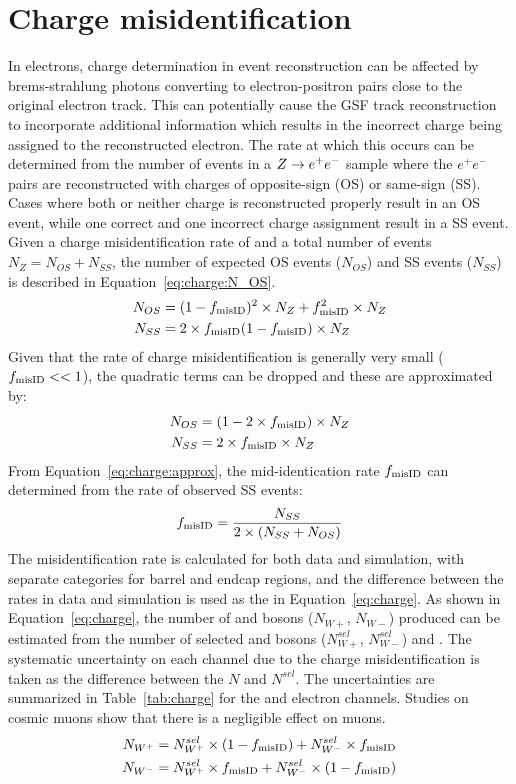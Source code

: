\section{Charge misidentification}
In electrons, charge determination in event reconstruction can be affected by brems-strahlung photons converting to electron-positron pairs close to the original electron track. This can potentially cause the GSF track reconstruction to incorporate additional information which results in the incorrect charge being assigned to the reconstructed electron. The rate at which this occurs can be determined from the number of events in a $Z \to e^+ e^-$ sample where the $e^+ e^-$ pairs are reconstructed with charges of opposite-sign (OS) or same-sign (SS). Cases where both or neither charge is reconstructed properly result in an OS event, while one correct and one incorrect charge assignment result in a SS event. Given a charge misidentification rate of \fq and a total number of \zee events $N_Z = N_{OS}+N_{SS}$, the number of expected OS events ($N_{OS}$) and SS events ($N_{SS}$) is described in Equation~\ref{eq:charge:N_OS}. 
\begin{equation}
\begin{aligned}
N_{OS} &= (1 - f_{\mathrm{misID}})^2 \times N_Z + f_{\mathrm{misID}}^2 \times N_Z \\
N_{SS} &= 2 \times f_{\mathrm{misID}} (1- f_{\mathrm{misID}}) \times N_Z
\label{eq:charge:N_OS}
\end{aligned}
\end{equation}
Given that the rate of charge misidentification is generally very small ($f_{\mathrm{misID}} << 1$), the quadratic terms can be dropped and these are approximated by: 
\begin{equation}
\begin{aligned}
N_{OS} &= (1 - 2\times f_{\mathrm{misID}}) \times N_Z \\
N_{SS} &= 2 \times f_{\mathrm{misID}} \times N_Z
\label{eq:charge:approx}
\end{aligned}
\end{equation}
From Equation~\ref{eq:charge:approx}, the mid-identication rate $f_{\mathrm{misID}}$ can determined from the rate of observed SS events: 
\begin{equation}
f_{\mathrm{misID}} = \frac{N_{SS}}{2\times(N_{SS} + N_{OS})}
\end{equation}
The misidentification rate is calculated for both data and simulation, with separate categories for barrel and endcap regions, and the difference between the rates in data and simulation is used as the \fq in Equation~\ref{eq:charge}. As shown in Equation~\ref{eq:charge}, the number of \Wp and \Wm bosons ($N_{W+}$, $N_{W-}$) produced can be estimated from the number of selected \Wp and \Wm bosons ($N^{sel}_{W+}$, $N^{sel}_{W-}$) and \fq. The systematic uncertainty on each channel due to the charge misidentification is taken as the difference between the $N$ and $N^{sel}$. The uncertainties are summarized in Table~\ref{tab:charge} for the \sg and \sh electron channels. Studies on cosmic muons show that there is a negligible effect on muons.
\begin{equation}
\begin{aligned}
    N_{W^+} = N_{W^+}^{sel} \times (1-f_{\mathrm{misID}}) + N_{W^-}^{sel} \times f_{\mathrm{misID}} \\
    N_{W^-} = N_{W^+}^{sel} \times f_{\mathrm{misID}} + N_{W^-}^{sel} \times (1 - f_{\mathrm{misID}})
\label{eq:charge}
\end{aligned}
\end{equation}
 

